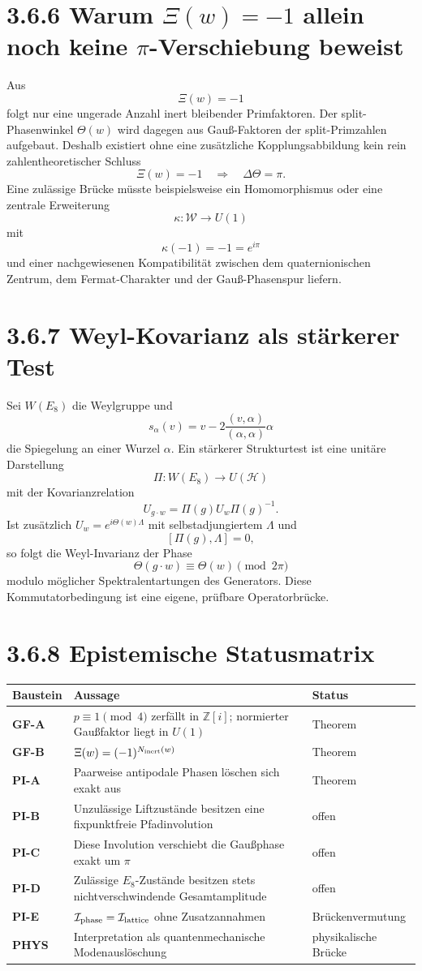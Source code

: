 \documentclass[11pt,a4paper]{article}
\begin{document}
\section*{3.6.6 Warum $\Xi(w)=-1$ allein noch keine $\pi$-Verschiebung beweist}
Aus
\[
\Xi(w)=-1
\]
folgt nur eine ungerade Anzahl inert bleibender Primfaktoren. Der split-Phasenwinkel $\Theta(w)$ wird dagegen aus Gauß-Faktoren der split-Primzahlen aufgebaut. Deshalb existiert ohne eine zusätzliche Kopplungsabbildung kein rein zahlentheoretischer Schluss
\[
\Xi(w)=-1\quad\Longrightarrow\quad\Delta\Theta=\pi.
\]
Eine zulässige Brücke müsste beispielsweise ein Homomorphismus oder eine zentrale Erweiterung
\[
\kappa:\mathcal W\longrightarrow U(1)
\]
mit
\[
\kappa(-1)=-1=e^{i\pi}
\]
und einer nachgewiesenen Kompatibilität zwischen dem quaternionischen Zentrum, dem Fermat-Charakter und der Gauß-Phasenspur liefern.

\section*{3.6.7 Weyl-Kovarianz als stärkerer Test}
Sei $W(E_8)$ die Weylgruppe und
\[
s_\alpha(v)=v-2\frac{(v,\alpha)}{(\alpha,\alpha)}\alpha
\]
die Spiegelung an einer Wurzel $\alpha$. Ein stärkerer Strukturtest ist eine unitäre Darstellung
\[
\Pi:W(E_8)\to U(\mathcal H)
\]
mit der Kovarianzrelation
\[
U_{g\cdot w}=\Pi(g)U_w\Pi(g)^{-1}.
\]
Ist zusätzlich $U_w=e^{i\Theta(w)\Lambda}$ mit selbstadjungiertem $\Lambda$ und
\[
[\Pi(g),\Lambda]=0,
\]
so folgt die Weyl-Invarianz der Phase
\[
\Theta(g\cdot w)\equiv\Theta(w)\pmod{2\pi}
\]
modulo möglicher Spektralentartungen des Generators. Diese Kommutatorbedingung ist eine eigene, prüfbare Operatorbrücke.

\section*{3.6.8 Epistemische Statusmatrix}
\begin{center}
\begin{tabularx}{\textwidth}{>{\bfseries}l X l}
\toprule
Baustein & Aussage & Status\\
\midrule
GF-A & $p\equiv1\pmod4$ zerfällt in $\mathbb Z[i]$; normierter Gaußfaktor liegt in $U(1)$ & Theorem\\
GF-B & $\Xi(w)=(-1)^{N_{\rm inert}(w)}$ & Theorem\\
PI-A & Paarweise antipodale Phasen löschen sich exakt aus & Theorem\\
PI-B & Unzulässige Liftzustände besitzen eine fixpunktfreie Pfadinvolution & offen\\
PI-C & Diese Involution verschiebt die Gaußphase exakt um $\pi$ & offen\\
PI-D & Zulässige $E_8$-Zustände besitzen stets nichtverschwindende Gesamtamplitude & offen\\
PI-E & $\mathcal I_{\rm phase}=\mathcal I_{\rm lattice}$ ohne Zusatzannahmen & Brückenvermutung\\
PHYS & Interpretation als quantenmechanische Modenauslöschung & physikalische Brücke\\
\bottomrule
\end{tabularx}
\end{center}
\end{document}
